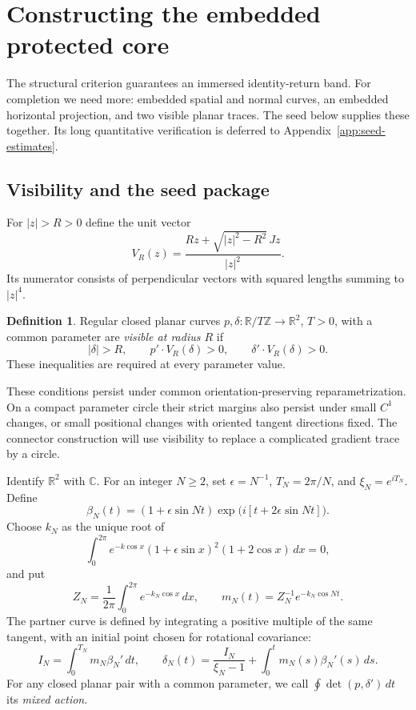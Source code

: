 \documentclass[11pt]{amsart}
\theoremstyle{definition}
\newtheorem{definition}[theorem]{Definition}
\theoremstyle{remark}
\newcommand{\R}{\mathbb R}\newcommand{\Sph}{\mathbb S}
\numberwithin{equation}{section}
\begin{document}
\section{Constructing the embedded protected core}\label{sec:protected-core}
The structural criterion guarantees an immersed identity-return band.
For completion we need more: embedded spatial and normal curves, an
embedded horizontal projection, and two visible planar traces. The seed
below supplies these together. Its long quantitative verification is
deferred to Appendix~\ref{app:seed-estimates}.

\subsection{Visibility and the seed package}\label{sec:corrugated-seed}
For $|z|>R>0$ define the unit vector
\begin{equation}\label{eq:visibility}
 V_R(z)=\frac{Rz+\sqrt{|z|^2-R^2}\,Jz}{|z|^2}.
\end{equation}
Its numerator consists of perpendicular vectors with squared lengths
summing to $|z|^4$.
\begin{definition}\label{def:visible}
Regular closed planar curves $p,\delta:\R/T\mathbb Z\to\R^2$, $T>0$,
with a common parameter are
\emph{visible at radius $R$} if
\begin{equation}\label{eq:visible-pair}
 |\delta|>R,\qquad p'\cdot V_R(\delta)>0,
 \qquad \delta'\cdot V_R(\delta)>0.
\end{equation}
These inequalities are required at every parameter value.
\end{definition}
These conditions persist under common orientation-preserving
reparametrization. On a compact parameter circle their strict margins
also persist under small $C^1$ changes, or small positional changes with
oriented tangent directions fixed. The connector construction will use
visibility to replace a complicated gradient trace by a circle.

Identify $\R^2$ with $\mathbb C$. For an integer $N\ge2$, set
$\epsilon=N^{-1}$, $T_N=2\pi/N$, and $\xi_N=e^{iT_N}$. Define
\begin{equation}\label{eq:corrugated-beta}
 \beta_N(t)=(1+\epsilon\sin Nt)
          \exp\bigl(i[t+2\epsilon\sin Nt]\bigr).
\end{equation}
Choose $k_N$ as the unique root of
\begin{equation}\label{eq:corrugated-root}
 \int_0^{2\pi}e^{-k\cos x}(1+\epsilon\sin x)^2(1+2\cos x)\,dx=0,
\end{equation}
and put
\[
 Z_N=\frac1{2\pi}\int_0^{2\pi}e^{-k_N\cos x}\,dx,
 \qquad m_N(t)=Z_N^{-1}e^{-k_N\cos Nt}.
\]
The partner curve is defined by integrating a positive multiple of the
same tangent, with an initial point chosen for rotational covariance:
\begin{equation}\label{eq:corrugated-delta}
 I_N=\int_0^{T_N}m_N\beta_N'\,dt,
 \qquad
 \delta_N(t)=\frac{I_N}{\xi_N-1}+\int_0^t m_N(s)\beta_N'(s)\,ds.
\end{equation}
For any closed planar pair with a common parameter, we call
$\oint\det(p,\delta')\,dt$ its \emph{mixed action}.
\end{document}
